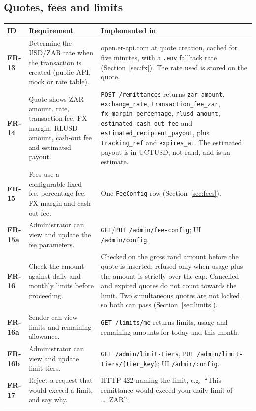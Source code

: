 \documentclass[11pt,a4paper]{article}
\makeatletter
\newcommand{\code}[1]{\texttt{\small #1}}
\newenvironment{frtable}{%
  \rowcolors{2}{white}{rowbg}
  \begin{longtable}{@{}>{\bfseries}l >{\RaggedRight\arraybackslash}p{5.5cm} >{\RaggedRight\arraybackslash}p{8.4cm}@{}}
  \toprule
  \rowcolor{headbg}\textbf{ID} & \textbf{Requirement} & \textbf{Implemented in} \\
  \midrule
  \endhead
  \bottomrule
  \endlastfoot}
 {\end{longtable}}
\makeatother
\begin{document}
\subsection{Quotes, fees and limits}
\begin{frtable}
FR-13  & Determine the USD/ZAR rate when the transaction is created (public API, mock or rate table).
       & open.er-api.com at quote creation, cached for five minutes, with a \code{.env} fallback rate (Section~\ref{sec:fx}). The rate used is stored on the quote. \\
FR-14  & Quote shows ZAR amount, rate, transaction fee, FX margin, RLUSD amount, cash-out fee and estimated payout.
       & \code{POST /remittances} returns \code{zar\_amount}, \code{exchange\_rate}, \code{transaction\_fee\_zar}, \code{fx\_margin\_percentage}, \code{rlusd\_amount}, \code{estimated\_cash\_out\_fee} and \code{estimated\_recipient\_payout}, plus \code{tracking\_ref} and \code{expires\_at}. The estimated payout is in UCTUSD, not rand, and is an estimate. \\
FR-15  & Fees use a configurable fixed fee, percentage fee, FX margin and cash-out fee.
       & One \code{FeeConfig} row (Section~\ref{sec:fees}). \\
FR-15a & Administrator can view and update the fee parameters.
       & \code{GET}/\code{PUT /admin/fee-config}; UI \code{/admin/config}. \\
FR-16  & Check the amount against daily and monthly limits before proceeding.
       & Checked on the gross rand amount before the quote is inserted; refused only when usage plus the amount is strictly over the cap. Cancelled and expired quotes do not count towards the limit. Two simultaneous quotes are not locked, so both can pass (Section~\ref{sec:limits}). \\
FR-16a & Sender can view limits and remaining allowance.
       & \code{GET /limits/me} returns limits, usage and remaining amounts for today and this month. \\
FR-16b & Administrator can view and update limit tiers.
       & \code{GET /admin/limit-tiers}, \code{PUT /admin/limit-tiers/\{tier\_key\}}; UI \code{/admin/config}. \\
FR-17  & Reject a request that would exceed a limit, and say why.
       & HTTP 422 naming the limit, e.g.\ ``This remittance would exceed your daily limit of \ldots\ ZAR''. \\
\end{frtable}
\end{document}

